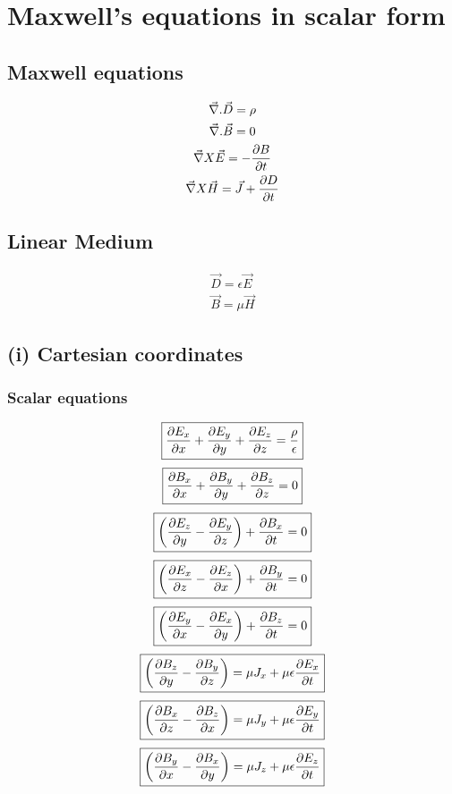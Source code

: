 \documentclass[11pt, a4paper]{article}
\begin{document}
\section{Maxwell's equations in scalar form}
\subsection*{Maxwell equations}
\begin{gather}  
    \vec{\nabla}.\vec{D} = \rho\\
    \vec{\nabla}. \vec{B} = 0 \\
    \vec{\nabla}X\vec{E}  = -\pdv{B}{t}\\
    \vec{\nabla}X\vec{H} = \vec{J}+\pdv{D}{t}
\end{gather}
\subsection*{Linear Medium}
\begin{gather}
    \vec{D} = \epsilon \vec{E}\\
    \vec{B} = \mu \vec{H}
\end{gather}
\subsection*{(i) Cartesian coordinates}

\subsubsection*{Scalar equations}
\begin{equation}
    \boxed{\pdv{ E_{x} }{x}+\pdv{ E_{y} }{y}+\pdv{ E_{z} }{z} = \frac{\rho}{\epsilon}}
\end{equation}
\begin{equation}
    \boxed{\pdv{B_{x} }{x}+\pdv{B_{y} }{y}+\pdv{B_{z} }{z} = 0}
\end{equation}
\begin{equation}
    \boxed{\left(\pdv{E_{z} }{y}-\pdv{E_{y} }{z}\right)+\pdv{B_{x} }{t}=0}
\end{equation}
\begin{equation}
    \boxed{ \left(\pdv{E_{x} }{z}-\pdv{E_{z} }{x}\right)+\pdv{B_{y} }{t}=0}
\end{equation}
\begin{equation}
    \boxed{\left(\pdv{E_{y} }{x}-\pdv{E_{x} }{y}\right)+\pdv{B_{z} }{t}=0}
\end{equation}
\begin{equation}
    \boxed{\left(\pdv{B_{z} }{y}-\pdv{B_{y} }{z}\right)=\mu J_x + \mu\epsilon \pdv{E_x}{t}}
\end{equation}
\begin{equation}
    \boxed{\left(\pdv{B_{x} }{z}-\pdv{B_{z} }{x}\right)= \mu J_y + \mu\epsilon \pdv{E_y}{t}}
\end{equation}
\begin{equation}
    \boxed{\left(\pdv{B_{y} }{x}-\pdv{B_{x} }{y}\right)=\mu J_z + \mu\epsilon \pdv{E_z}{t} }
\end{equation}
\end{document}
